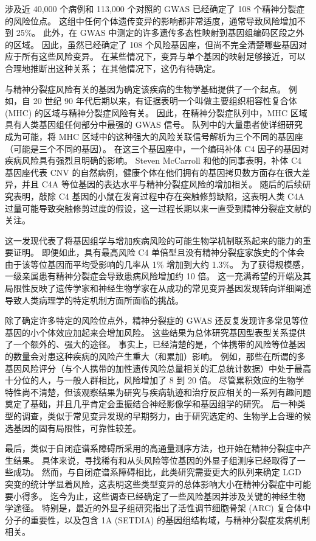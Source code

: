 涉及近 40,000 个病例和 113,000 个对照的 GWAS 已经确定了 108 个精神分裂症的风险位点。 
这组中任何个体遗传变异的影响都非常适度，通常导致风险增加不到 25\%。 
此外，在 GWAS 中测定的许多遗传多态性映射到基因组编码区段之外的区域。 因此，虽然已经确定了 108 个风险基因座，但尚不完全清楚哪些基因对应于所有这些风险变异。 
在某些情况下，变异与单个基因的映射足够接近，可以合理地推断出这种关系； 在其他情况下，这仍有待确定。


与精神分裂症风险有关的基因为确定该疾病的生物学基础提供了一个起点。 
例如，自 20 世纪 90 年代后期以来，有证据表明一个叫做主要组织相容性复合体 (MHC) 的区域与精神分裂症风险有关。 
因此，在精神分裂症队列中，MHC 区域具有人类基因组任何部分中最强的 GWAS 信号。 
队列中的大量患者使详细研究成为可能，将 MHC 区域中的这种强大的风险关联信号解析为三个不同的基因座（可能是三个不同的基因）。 
在这三个基因座中，一个编码补体 C4 因子的基因对疾病风险具有强烈且明确的影响。 
Steven McCarroll 和他的同事表明，补体 C4 基因座代表 CNV 的自然病例，健康个体在他们拥有的基因拷贝数方面存在很大差异，并且 C4A 等位基因的表达水平与精神分裂症风险的增加相关。 
随后的后续研究表明，敲除 C4 基因的小鼠在发育过程中存在突触修剪缺陷，这表明人类 C4A 过量可能导致突触修剪过度的假设，这一过程长期以来一直受到精神分裂症文献的关注。


这一发现代表了将基因组学与增加疾病风险的可能生物学机制联系起来的能力的重要证明。 
即便如此，具有最高风险 C4 单倍型且没有精神分裂症家族史的个体会由于该等位基因而平均受影响的几率从 1\% 增加到大约 1.3\%。 
为了获得规模感，一级亲属患有精神分裂症会导致患病风险增加约 10 倍。 
这一充满希望的开端及其局限性反映了遗传学家和神经生物学家在从成功的常见变异基因发现转向详细阐述导致人类病理学的特定机制方面所面临的挑战。


除了确定许多特定的风险位点外，精神分裂症的 GWAS 还反复发现许多常见等位基因的小个体效应加起来会增加风险。 
这些结果为总体研究基因型表型关系提供了一个额外的、强大的途径。 
事实上，已经清楚的是，个体携带的风险等位基因的数量会对患这种疾病的风险产生重大（和累加）影响。 
例如，那些在所谓的多基因风险评分（与个人携带的加性遗传风险总量相关的汇总统计数据）中处于最高十分位的人，与一般人群相比，风险增加了 8 到 20 倍。 
尽管累积效应的生物学特性尚不清楚，但该观察结果为研究与疾病轨迹和治疗反应相关的一系列有趣问题奠定了基础，并且几乎肯定会重振结合神经影像学和基因组学的研究。 
后一种类型的调查，类似于常见变异发现的早期努力，由于研究选定的、生物学上合理的候选基因的固有局限性，可靠性较差。


最后，类似于自闭症谱系障碍所采用的高通量测序方法，也开始在精神分裂症中产生结果。 
具体来说，寻找稀有和从头风险等位基因的外显子组测序已经取得了一些成功。 
然而，与自闭症谱系障碍相比，此类研究需要更大的队列来确定 LGD 突变的统计学显着风险，这表明这些类型变异的总体影响大小在精神分裂症中可能要小得多。 
迄今为止，这些调查已经确定了一些风险基因并涉及关键的神经生物学途径。 
特别是，最近的外显子组研究指出了活性调节细胞骨架 (ARC) 复合体中分子的重要性，以及包含 1A (SETDIA) 的基因组结构域，与精神分裂症发病机制相关。



